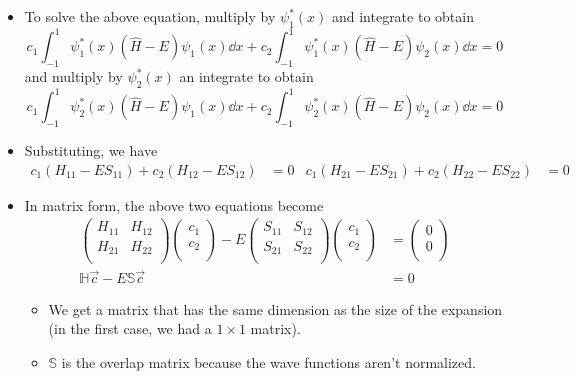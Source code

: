 \documentclass[../notes.tex]{subfiles}
\begin{document}
\begin{itemize}
\begin{itemize}
        \item To solve the above equation, multiply by $\psi_1^*(x)$ and integrate to obtain
        \begin{equation*}
            c_1\int_{-1}^1\psi_1^*(x)(\hat{H}-E)\psi_1(x)\dd{x}+c_2\int_{-1}^1\psi_1^*(x)(\hat{H}-E)\psi_2(x)\dd{x} = 0
        \end{equation*}
        and multiply by $\psi_2^*(x)$ an integrate to obtain
        \begin{equation*}
            c_1\int_{-1}^1\psi_2^*(x)(\hat{H}-E)\psi_1(x)\dd{x}+c_2\int_{-1}^1\psi_2^*(x)(\hat{H}-E)\psi_2(x)\dd{x} = 0
        \end{equation*}
        \item Substituting, we have
        \begin{align*}
            c_1(H_{11}-ES_{11})+c_2(H_{12}-ES_{12}) &= 0&
            c_1(H_{21}-ES_{21})+c_2(H_{22}-ES_{22}) &= 0
        \end{align*}
        \item In matrix form, the above two equations become
        \begin{align*}
            \begin{pmatrix}
                H_{11} & H_{12}\\
                H_{21} & H_{22}\\
            \end{pmatrix}
            \begin{pmatrix}
                c_1\\
                c_2\\
            \end{pmatrix}
            -E
            \begin{pmatrix}
                S_{11} & S_{12}\\
                S_{21} & S_{22}\\
            \end{pmatrix}
            \begin{pmatrix}
                c_1\\
                c_2\\
            \end{pmatrix}
            &=
            \begin{pmatrix}
                0\\
                0\\
            \end{pmatrix}\\
            \mathbb{H}\vec{c}-E\mathbb{S}\vec{c} &= 0
        \end{align*}
        \begin{itemize}
            \item We get a matrix that has the same dimension as the size of the expansion (in the first case, we had a $1\times 1$ matrix).
            \item $\mathbb{S}$ is the overlap matrix because the wave functions aren't normalized.
        \end{itemize}
    \end{itemize}
\end{itemize}
\end{document}
